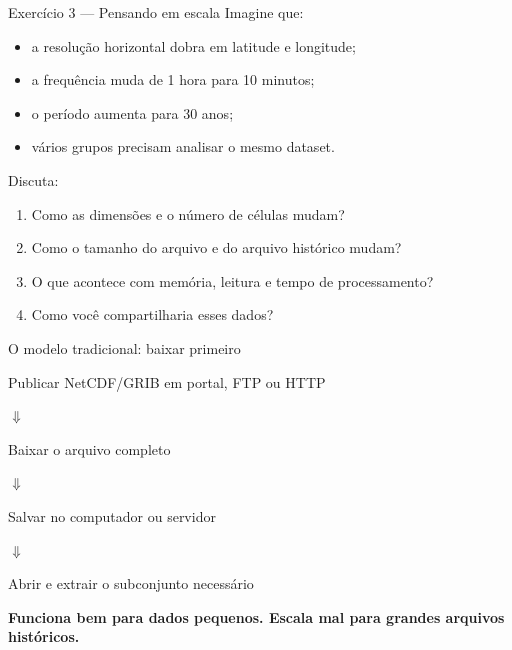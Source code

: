 \documentclass[aspectratio=169]{beamer}
\begin{document}
\begin{frame}{Exercício 3 --- Pensando em escala}
Imagine que:

\begin{itemize}
  \item a resolução horizontal dobra em latitude e longitude;
  \item a frequência muda de 1 hora para 10 minutos;
  \item o período aumenta para 30 anos;
  \item vários grupos precisam analisar o mesmo dataset.
\end{itemize}

\vspace{0.4cm}

Discuta:

\begin{enumerate}
  \item Como as dimensões e o número de células mudam?
  \item Como o tamanho do arquivo e do arquivo histórico mudam?
  \item O que acontece com memória, leitura e tempo de processamento?
  \item Como você compartilharia esses dados?
\end{enumerate}
\end{frame}

\begin{frame}{O modelo tradicional: baixar primeiro}
\Large
\centering

Publicar NetCDF/GRIB em portal, FTP ou HTTP

\vspace{0.25cm}
$\Downarrow$

Baixar o arquivo completo

\vspace{0.25cm}
$\Downarrow$

Salvar no computador ou servidor

\vspace{0.25cm}
$\Downarrow$

Abrir e extrair o subconjunto necessário

\vspace{0.45cm}

\textbf{Funciona bem para dados pequenos. Escala mal para grandes arquivos históricos.}
\end{frame}
\end{document}
